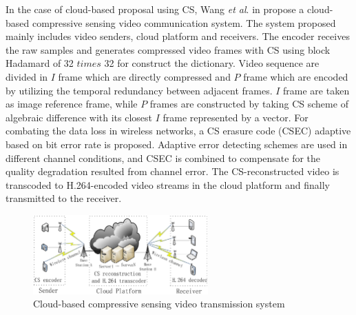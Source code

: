 In the case of cloud-based proposal using CS, Wang \emph{et al}. in \cite{6694139} propose a cloud-based compressive sensing video communication system. The system proposed mainly includes video senders, cloud platform and receivers. The encoder receives the raw samples and generates compressed video frames with CS using block Hadamard of 32 $times$ 32 for construct the dictionary. Video sequence are divided in $I$ frame which are directly compressed and $P$ frame which are encoded by utilizing the temporal redundancy between  adjacent frames. $I$ frame are taken as image reference frame, while $P$ frames are constructed by taking CS scheme of algebraic difference with its closest $I$ frame represented by a vector. For combating the data loss in wireless networks, a CS erasure code (CSEC) adaptive based on bit error rate is proposed. Adaptive error detecting schemes are used in different channel conditions, and  CSEC is combined to compensate for the quality degradation resulted from channel error. The CS-reconstructed video is transcoded to H.264-encoded video streams in the cloud platform and finally transmitted to the receiver. \\

\begin{figure}[!h]
\centering
\includegraphics[width=0.6\textwidth]{images/cloud-based.eps}
\caption[Cloud-based compressive sensing video transmission system]{Cloud-based compressive sensing video transmission system \cite{6694139}}
\label{fig:cloud-based}
\end{figure} 